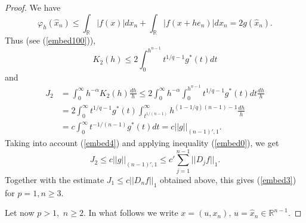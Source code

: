 \documentclass[12pt,twoside,reqno]{amsart}
\numberwithin{equation}{section}
\theoremstyle{definition}
\numberwithin{equation}{section}
\def\a{\alpha}
\def\R{\mathbb{R}}
\def\f{\varphi}
\begin{document}
\begin{proof}
We have
$$
\f_h(\widehat x_n)\le \int_\R |f(x)|dx_n+\int_\R |f(x+h e_n)|dx_n = 2g(\widehat x_n).
$$
Thus (see (\ref{embed100})),
$$
K_2(h)\le 2\int_0^{h^{n-1}} t^{1/q-1}g^*(t)dt
$$
and
$$
\begin{aligned}
J_2&= \int_0^\infty h^{-\a}K_2(h)\frac{dh}{h}\le 2\int_0^\infty  h^{-\a}\int_0^{h^{n-1}} t^{1/q-1}g^*(t)dt\frac{dh}{h}\\
&=2\int_0^\infty t^{1/q-1}g^*(t)\int_{t^{1/(n-1)}}^\infty h^{(1-1/q)(n-1)-1}\frac{dh}{h}\\
&=c\int_0^\infty t^{-1/(n-1)}g^*(t)dt=c||g||_{(n-1)',1}.
\end{aligned}
$$
Taking into account (\ref{embed4}) and applying inequality (\ref{embed0}), we get
\begin{equation*}
J_2\le c||g||_{(n-1)',1}\le c'\sum_{j=1}^{n-1}||D_{j}f||_1.
\end{equation*}
Together with the estimate $J_1\le c ||D_nf||_1$ obtained above, this gives (\ref{embed3}) for $p=1, n\ge 3.$

Let now $p>1,$ $n\ge 2.$  In what follows we write $x=(u,x_n),\, u=\widehat x_n\in \R^{n-1}.$


\end{proof}
\end{document}

